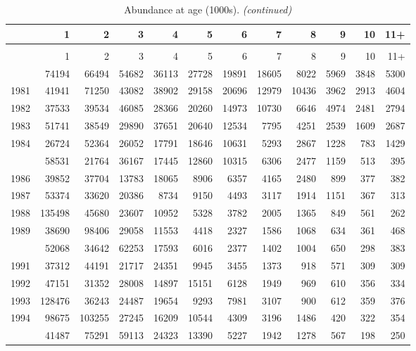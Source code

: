 \documentclass[
]{article}
\begin{document}
\begin{longtable}[t]{lrrrrrrrrrrr}
\caption{\label{tab:NAA-table}Abundance at age (1000s).}\\
\toprule
  & 1 & 2 & 3 & 4 & 5 & 6 & 7 & 8 & 9 & 10 & 11+\\
\midrule
\endfirsthead
\caption[]{Abundance at age (1000s). \textit{(continued)}}\\
\toprule
  & 1 & 2 & 3 & 4 & 5 & 6 & 7 & 8 & 9 & 10 & 11+\\
\midrule
\endhead

\endfoot
\bottomrule
\endlastfoot
1980 & 74194 & 66494 & 54682 & 36113 & 27728 & 19891 & 18605 & 8022 & 5969 & 3848 & 5300\\
1981 & 41941 & 71250 & 43082 & 38902 & 29158 & 20696 & 12979 & 10436 & 3962 & 2913 & 4604\\
1982 & 37533 & 39534 & 46085 & 28366 & 20260 & 14973 & 10730 & 6646 & 4974 & 2481 & 2794\\
1983 & 51741 & 38549 & 29890 & 37651 & 20640 & 12534 & 7795 & 4251 & 2539 & 1609 & 2687\\
1984 & 26724 & 52364 & 26052 & 17791 & 18646 & 10631 & 5293 & 2867 & 1228 & 783 & 1429\\
\addlinespace
1985 & 58531 & 21764 & 36167 & 17445 & 12860 & 10315 & 6306 & 2477 & 1159 & 513 & 395\\
1986 & 39852 & 37704 & 13783 & 18065 & 8906 & 6357 & 4165 & 2480 & 899 & 377 & 382\\
1987 & 53374 & 33620 & 20386 & 8734 & 9150 & 4493 & 3117 & 1914 & 1151 & 367 & 313\\
1988 & 135498 & 45680 & 23607 & 10952 & 5328 & 3782 & 2005 & 1365 & 849 & 561 & 262\\
1989 & 38690 & 98406 & 29058 & 11553 & 4418 & 2327 & 1586 & 1068 & 634 & 361 & 468\\
\addlinespace
1990 & 52068 & 34642 & 62253 & 17593 & 6016 & 2377 & 1402 & 1004 & 650 & 298 & 383\\
1991 & 37312 & 44191 & 21717 & 24351 & 9945 & 3455 & 1373 & 918 & 571 & 309 & 309\\
1992 & 47151 & 31352 & 28008 & 14897 & 15151 & 6128 & 1949 & 969 & 610 & 356 & 334\\
1993 & 128476 & 36243 & 24487 & 19654 & 9293 & 7981 & 3107 & 900 & 612 & 359 & 376\\
1994 & 98675 & 103255 & 27245 & 16209 & 10544 & 4309 & 3196 & 1486 & 420 & 322 & 354\\
\addlinespace
1995 & 41487 & 75291 & 59113 & 24323 & 13390 & 5227 & 1942 & 1278 & 567 & 198 & 250\\

\end{longtable}
\end{document}
